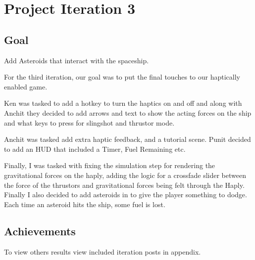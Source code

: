 \hypertarget{project-iteration-3}{%
\section{Project Iteration 3}\label{project-iteration-3}}

\hypertarget{goal}{%
\subsection{Goal}\label{goal}}

Add Asteroids that interact with the spaceship.

For the third iteration, our goal was to put the final touches to our
haptically enabled game.

Ken was tasked to add a hotkey to turn the haptics on and off and along
with Anchit they decided to add arrows and text to show the acting
forces on the ship and what keys to press for slingshot and thrustor
mode.

Anchit was tasked add extra haptic feedback, and a tutorial scene. Punit
decided to add an HUD that included a Timer, Fuel Remaining etc.

Finally, I was tasked with fixing the simulation step for rendering the
gravitational forces on the haply, adding the logic for a crossfade
slider between the force of the thrustors and gravitational forces being
felt through the Haply. Finally I also decided to add asteroids in to
give the player something to dodge. Each time an asteroid hits the ship,
some fuel is lost.

\hypertarget{achievements}{%
\subsection{Achievements}\label{achievements}}

To view others results view included iteration posts in appendix.

